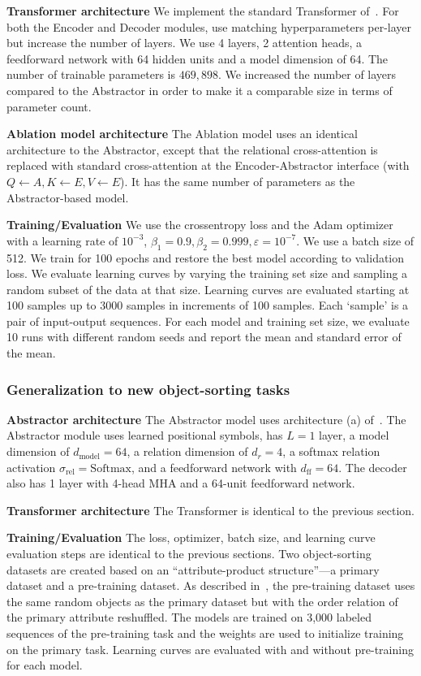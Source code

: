 \textbf{Transformer architecture} We implement the standard Transformer of~\citep{vaswani2017attention}. For both the Encoder and Decoder modules, use matching hyperparameters per-layer but increase the number of layers. We use 4 layers, 2 attention heads, a feedforward network with 64 hidden units and a model dimension of 64. The number of trainable parameters is $469,898$. We increased the number of layers compared to the Abstractor in order to make it a comparable size in terms of parameter count.

\textbf{Ablation model architecture} The Ablation model uses an identical architecture to the Abstractor, except that the relational cross-attention is replaced with standard cross-attention at the Encoder-Abstractor interface (with $Q \gets A, K \gets E, V \gets E$). It has the same number of parameters as the Abstractor-based model.

\textbf{Training/Evaluation} We use the crossentropy loss and the Adam optimizer with a learning rate of $10^{-3}$, $\beta_1 = 0.9, \beta_2 = 0.999, \varepsilon = 10^{-7}$. We use a batch size of 512. We train for 100 epochs and restore the best model according to validation loss. We evaluate learning curves by varying the training set size and sampling a random subset of the data at that size. Learning curves are evaluated starting at 100 samples up to 3000 samples in increments of 100 samples. Each `sample' is a pair of input-output sequences. For each model and training set size, we evaluate 10 runs with different random seeds and report the mean and standard error of the mean.

\subsubsection{Generalization to new object-sorting tasks}

\textbf{Abstractor architecture} The Abstractor model uses architecture (a) of~. The Abstractor module uses learned positional symbols, has $L=1$ layer, a model dimension of $d_{\mathrm{model}} = 64$, a relation dimension of $d_r = 4$, a softmax relation activation $\sigma_{\mathrm{rel}} = \mathrm{Softmax}$, and a feedforward network with $d_{\mathrm{ff}} = 64$.  The decoder also has 1 layer with 4-head MHA and a 64-unit feedforward network.

\textbf{Transformer architecture} The Transformer is identical to the previous section.

\textbf{Training/Evaluation} The loss, optimizer, batch size, and learning curve evaluation steps are identical to the previous sections. Two object-sorting datasets are created based on an ``attribute-product structure''---a primary dataset and a pre-training dataset. As described in~, the pre-training dataset uses the same random objects as the primary dataset but with the order relation of the primary attribute reshuffled. The models are trained on 3,000 labeled sequences of the pre-training task and the weights are used to initialize training on the primary task. Learning curves are evaluated with and without pre-training for each model.

